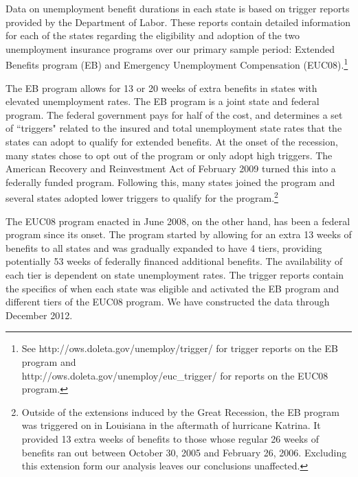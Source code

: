 \documentclass[12pt]{article}
\newcommand{\1}{\mathbf{1}}
\begin{document}
Data on unemployment benefit durations in each state is based on trigger reports provided by the Department of Labor. These reports contain detailed information for each of the states regarding the eligibility and adoption of the two unemployment insurance programs over our primary sample period: Extended Benefits program (EB) and Emergency Unemployment Compensation (EUC08).\footnote{See http://ows.doleta.gov/unemploy/trigger/ for trigger reports on the EB program and \\ http://ows.doleta.gov/unemploy/euc\_trigger/ for reports on the EUC08 program.}

The EB program allows for 13 or 20 weeks of extra benefits in states with elevated unemployment rates. The EB program is a joint state and federal program.  The federal government pays for half of the cost, and determines a set of ``triggers" related to the insured and total unemployment state rates that the states can adopt to qualify for extended benefits.   At the onset of the recession, many states chose to opt out of the program or only adopt high triggers. The American Recovery and Reinvestment Act of February 2009 turned this into a federally funded program. Following this, many states joined the program and several states adopted lower triggers to qualify for the program.\footnote{Outside of the extensions induced by the Great Recession, the EB program was triggered on in Louisiana in the aftermath of hurricane Katrina. It provided 13 extra weeks of benefits to those whose regular 26 weeks of benefits ran out between October 30, 2005 and February 26, 2006. Excluding this extension form our analysis leaves our conclusions unaffected.}


The EUC08 program enacted in June 2008, on the other hand, has been a federal program since its onset. The program started by allowing for an extra 13 weeks of benefits to all states and was gradually expanded to have 4 tiers, providing potentially 53 weeks of federally financed additional benefits. The availability of each tier is dependent on state unemployment rates. The trigger reports contain the specifics of when each state was eligible and activated the EB program and different tiers of the EUC08 program. We have constructed the data through December 2012.
\end{document}
